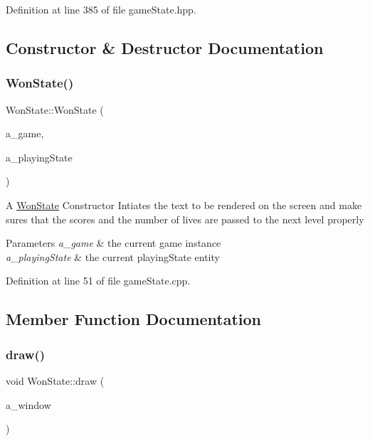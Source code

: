 Definition at line 385 of file game\+State.\+hpp.



\subsection{Constructor \& Destructor Documentation}
\mbox{\label{class_won_state_ac6d2bf732076e157c50066c8c0331f73}} 
\subsubsection{\texorpdfstring{Won\+State()}{WonState()}}
{\footnotesize\ttfamily Won\+State\+::\+Won\+State (\begin{DoxyParamCaption}\item[{\hyperlink{class_game}{Game} $\ast$}]{a\+\_\+game,  }\item[{\hyperlink{class_game_state}{Game\+State} $\ast$}]{a\+\_\+playing\+State }\end{DoxyParamCaption})}

A \hyperlink{class_won_state}{Won\+State} Constructor Intiates the text to be rendered on the screen and make sures that the scores and the number of lives are passed to the next level properly 
\begin{DoxyParams}{Parameters}
{\em a\+\_\+game} & the current game instance \\
\hline
{\em a\+\_\+playing\+State} & the current playing\+State entity \\
\hline
\end{DoxyParams}


Definition at line 51 of file game\+State.\+cpp.



\subsection{Member Function Documentation}
\mbox{\label{class_won_state_a88bcef07ae234fe7ba672d1c6628d2c0}} 
\subsubsection{\texorpdfstring{draw()}{draw()}}
{\footnotesize\ttfamily void Won\+State\+::draw (\begin{DoxyParamCaption}\item[{sf\+::\+Render\+Window \&}]{a\+\_\+window }\end{DoxyParamCaption})\hspace{0.3cm}{\ttfamily [virtual]}}

